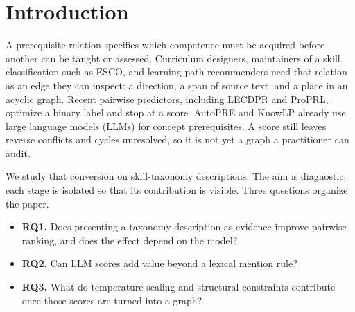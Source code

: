 \documentclass{ws-ijait}
\begin{document}

\section{Introduction}
A prerequisite relation specifies which competence must be acquired
before another can be taught or assessed.
Curriculum designers, maintainers of a skill classification such as
{ESCO}, and learning-path recommenders need that relation as an
edge they can inspect: a direction, a span of source text, and a
place in an acyclic graph.
Recent pairwise predictors, including {LECDPR}\cite{Xiao_2026} and
{ProPRL}\cite{Cheng_2026}, optimize a binary label and stop at a
score.
{AutoPRE}\cite{Li_AutoPRE_2025} and {KnowLP}\cite{Cheng_KnowLP}
already use large language models ({LLMs}) for concept
prerequisites.
A score still leaves reverse conflicts and cycles unresolved, so it
is not yet a graph a practitioner can audit.

We study that conversion on skill-taxonomy descriptions.
The aim is diagnostic: each stage is isolated so that its
contribution is visible.
Three questions organize the paper.
\begin{itemize}
\item \textbf{RQ1.} Does presenting a taxonomy description as
evidence improve pairwise ranking, and does the effect depend on
the model?
\item \textbf{RQ2.} Can {LLM} scores add value beyond a lexical
mention rule?
\item \textbf{RQ3.} What do temperature scaling and structural
constraints contribute once those scores are turned into a graph?
\end{itemize}
\end{document}
